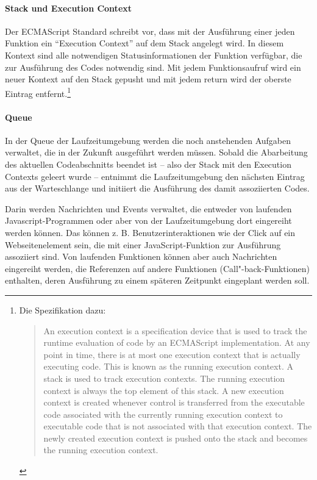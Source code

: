 \documentclass[
11pt, %
a4paper, %
oneside, %
pdfspacing, %
headinclude,
BCOR5mm, %
ngerman, %
bibtotocnumbered,
]{scrartcl}
\begin{document}
		\paragraph{Stack und Execution Context} Der ECMAScript Standard schreibt vor, dass mit der Ausführung einer jeden Funktion ein "`Execution Context"' auf dem Stack angelegt wird.
		In diesem Kontext sind alle notwendigen Statusinformationen der Funktion verfügbar, die zur Ausführung des Codes notwendig sind. Mit jedem Funktionsaufruf wird ein neuer Kontext auf den Stack gepusht und mit jedem \textsf{return} wird der oberste Eintrag entfernt.\footnote{Die Spezifikation dazu: 
			\begin{quote}An execution context is a specification device that is used to track the runtime evaluation of code by an ECMAScript implementation. At any point in time, there is at most one execution context that is actually executing code. This is known as the running execution context. A stack is used to track execution contexts. The running execution context is always the top element of this stack. A new execution context is created whenever control is transferred from the executable code associated with the currently running execution context to executable code that is not associated with that execution context. The newly created execution context is pushed onto the stack and becomes the running execution context.~\citep[\S~8.3]{EcmaTC39.}
		\end{quote}}
		
		\paragraph{Queue} In der Queue der Laufzeitumgebung werden die noch anstehenden Aufgaben verwaltet, die in der Zukunft ausgeführt werden müssen. Sobald die Abarbeitung des aktuellen Codeabschnitts beendet ist -- also der Stack mit den Execution Contexts geleert wurde -- entnimmt die Laufzeitumgebung den nächsten Eintrag aus der Warteschlange und initiiert die Ausführung des damit assoziierten Codes.
		
		Darin werden Nachrichten und Events verwaltet, die entweder von laufenden Javascript-Programmen oder aber von der Laufzeitumgebung dort eingereiht werden können. Das können z. B. Benutzerinteraktionen wie der Click auf ein Webseitenelement sein, die mit einer JavaScript-Funktion zur Ausführung assoziiert sind. Von laufenden Funktionen können aber auch Nachrichten eingereiht werden, die Referenzen auf andere Funktionen (Call"-back-Funktionen) enthalten, deren Ausführung zu einem späteren Zeitpunkt eingeplant werden soll.
		
\end{document}
